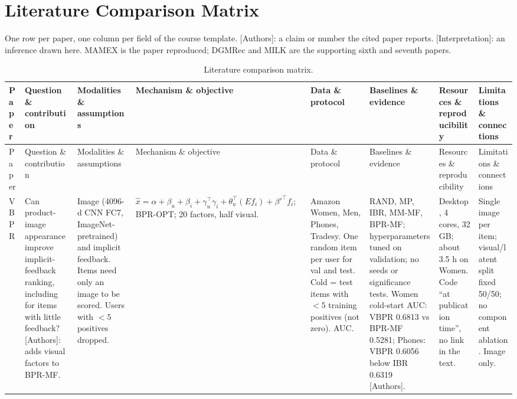 \documentclass[conference]{IEEEtran}
\begin{document}
\section{Literature Comparison Matrix}
\label{app:matrix}

One row per paper, one column per field of the course template. [Authors]: a claim or number the cited paper reports. [Interpretation]: an inference drawn here. MAMEX is the paper reproduced; DGMRec and MILK are the supporting sixth and seventh papers.

\clearpage
\onecolumn
\begingroup\centering\scriptsize\setlength{\tabcolsep}{4pt}
\renewcommand{\arraystretch}{1.1}
\begin{longtable}{@{}p{1.7cm}*{7}{>{\raggedright\arraybackslash}p{2.0cm}}@{}}
\caption{Literature comparison matrix.}\label{tab:matrix}\\
\toprule
Paper & Question \& contribution & Modalities \& assumptions & Mechanism \& objective & Data \& protocol & Baselines \& evidence & Resources \& reproducibility & Limitations \& connections \\
\midrule
\endfirsthead
\toprule
Paper & Question \& contribution & Modalities \& assumptions & Mechanism \& objective & Data \& protocol & Baselines \& evidence & Resources \& reproducibility & Limitations \& connections \\
\midrule
\endhead
\bottomrule
\endfoot
VBPR~\cite{he2016vbpr} & Can product-image appearance improve implicit-feedback ranking, including for items with little feedback? [Authors]: adds visual factors to BPR-MF. & Image (4096-d CNN FC7, ImageNet-pretrained) and implicit feedback. Items need only an image to be scored. Users with $<5$ positives dropped. & $\hat{x} = \alpha + \beta_u + \beta_i + \gamma_u^{\top}\gamma_i + \theta_u^{\top}(E f_i) + \beta'^{\top} f_i$; BPR-OPT; 20 factors, half visual. & Amazon Women, Men, Phones, Tradesy. One random item per user for val and test. Cold = test items with $<5$ training positives (not zero). AUC. & RAND, MP, IBR, MM-MF, BPR-MF; hyperparameters tuned on validation; no seeds or significance tests. Women cold-start AUC: VBPR 0.6813 vs BPR-MF 0.5281; Phones: VBPR 0.6056 below IBR 0.6319 [Authors]. & Desktop, 4 cores, 32 GB; about 3.5 h on Women. Code ``at publication time'', no link in the text. & Single image per item; visual/latent split fixed 50/50; no component ablation. Image only. \\
\midrule

\end{longtable}
\end{document}
